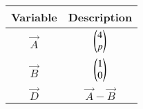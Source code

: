 \begin{tabular}[12pt]{ |c| c|}
    \hline
    \textbf{Variable} & \textbf{Description}\\ 
    \hline
    $\vec{A}$ & $\begin{pmatrix}4\\p\end{pmatrix}$ \\
    \hline 
    $\vec{B}$ & $\begin{pmatrix}1\\0\end{pmatrix}$ \\
	\hline
    $\vec{D}$ & $\vec{A}-\vec{B}$\\
    \hline 
    \end{tabular}
